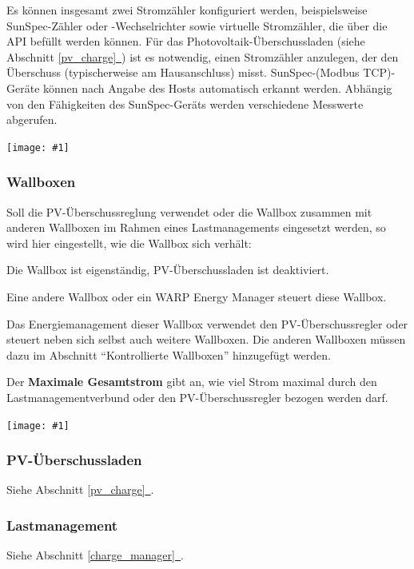 \documentclass[a4paper,10pt]{article}
\newcommand{\gfx}[1]{\texttt{[image: \#1]}}
\newcommand*{\fullref}[1]{Abschnitt \hyperref[{#1}]{\ref*{#1}~\nameref*{#1}}}
\begin{document}
\begin{multicols*}{2}
    Es können insgesamt zwei Stromzähler konfiguriert werden, beispielsweise SunSpec-Zähler oder -Wechselrichter
    sowie virtuelle Stromzähler, die über die API befüllt werden können. Für das
	Photovoltaik-Überschussladen (siehe \fullref{pv_charge}) ist es notwendig,
	einen Stromzähler anzulegen, der den Überschuss (typischerweise am Hausanschluss) misst. SunSpec-(Modbus TCP)-Geräte können nach Angabe des Hosts
    automatisch erkannt werden. Abhängig von den Fähigkeiten des SunSpec-Geräts werden verschiedene Messwerte abgerufen.

    \gfx{./img_warp3/resized/web_meters}

	\subsubsection{Wallboxen}

    Soll die PV-Überschussreglung verwendet oder
    die Wallbox zusammen mit anderen Wallboxen im Rahmen eines
	Lastmanagements eingesetzt werden, so wird hier
	eingestellt, wie die Wallbox sich verhält:
	\begin{description}[labelindent=0.5cm, leftmargin=0.5cm]
		\item[Deaktiviert] Die Wallbox ist eigenständig, PV-Über\-schussladen ist deaktiviert.
		\item[Fremdgesteuert] Eine andere Wallbox oder ein WARP Energy Manager steuert diese Wallbox.
		\item[Lastmanager / PV-Überschussladen] Das Energiemanagement dieser Wallbox verwendet den PV-Überschussregler oder steuert neben sich selbst auch weitere Wallboxen. Die anderen Wallboxen müssen dazu im
		Abschnitt \enquote{Kontrollierte Wallboxen} hinzugefügt werden.
	\end{description}

	Der \textbf{Maximale Gesamtstrom} gibt an, wie viel Strom maximal durch den Lastmanagementverbund oder den PV-Überschussregler bezogen werden darf.

	\gfx{./img_warp3/resized/web_charge_manager_chargers}

    \subsubsection{PV-Überschussladen}
    Siehe \fullref{pv_charge}.

    \subsubsection{Lastmanagement}
    Siehe \fullref{charge_manager}.


\end{multicols*}
\end{document}
